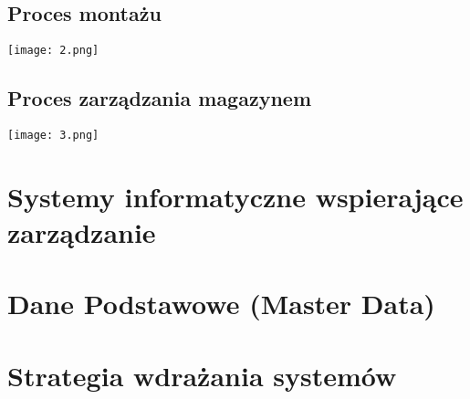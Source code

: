 \subsection{Proces montażu}
\begin{center}
    \texttt{[image: 2.png]}\\[0.5cm]
\end{center}
\subsection{Proces zarządzania magazynem}
\begin{center}
    \texttt{[image: 3.png]}\\[0.5cm]
\end{center}

\section{Systemy informatyczne wspierające zarządzanie}
\section{Dane Podstawowe (Master Data)}
\section{Strategia wdrażania systemów}